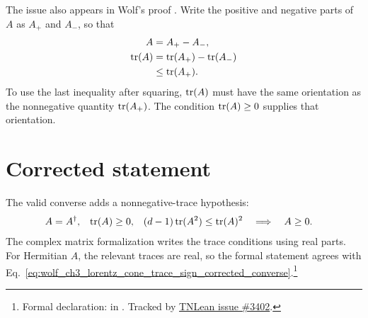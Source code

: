 \documentclass{article}
\begin{document}
The issue also appears in Wolf's proof
\cite[Proposition~3.7]{Wolf2012Quantum}. Write the positive and negative parts
of $A$ as $A_+$ and $A_-$, so that
\begin{align}
    A&=A_+-A_-,
    \label{eq:wolf_ch3_lorentz_cone_trace_sign_positive_negative_decomposition}\\
    \operatorname{tr}(A)
        &=\operatorname{tr}(A_+)-\operatorname{tr}(A_-)
    \label{eq:wolf_ch3_lorentz_cone_trace_sign_trace_decomposition}\\
        &\leq\operatorname{tr}(A_+).
    \label{eq:wolf_ch3_lorentz_cone_trace_sign_trace_upper_bound}
\end{align}
To use the last inequality after squaring, $\operatorname{tr}(A)$ must have the same
orientation as the nonnegative quantity $\operatorname{tr}(A_+)$. The condition
$\operatorname{tr}(A)\geq 0$ supplies that orientation.

\section{Corrected statement}

The valid converse adds a nonnegative-trace hypothesis:
\begin{align}
    A&=A^\dagger,
    &
    \operatorname{tr}(A)&\geq 0,
    &
    (d-1)\operatorname{tr}(A^2)&\leq\operatorname{tr}(A)^2
    \quad\Longrightarrow\quad
    A\geq 0.
    \label{eq:wolf_ch3_lorentz_cone_trace_sign_corrected_converse}
\end{align}
The complex matrix formalization writes the trace conditions using real parts.
For Hermitian $A$, the relevant traces are real, so the formal statement agrees
with Eq.~\ref{eq:wolf_ch3_lorentz_cone_trace_sign_corrected_converse}.\footnote{
Formal declaration:
in . Tracked by
\href{https://github.com/LionSR/TNLean/issues/3402}{TNLean issue \#3402}.}
\end{document}
